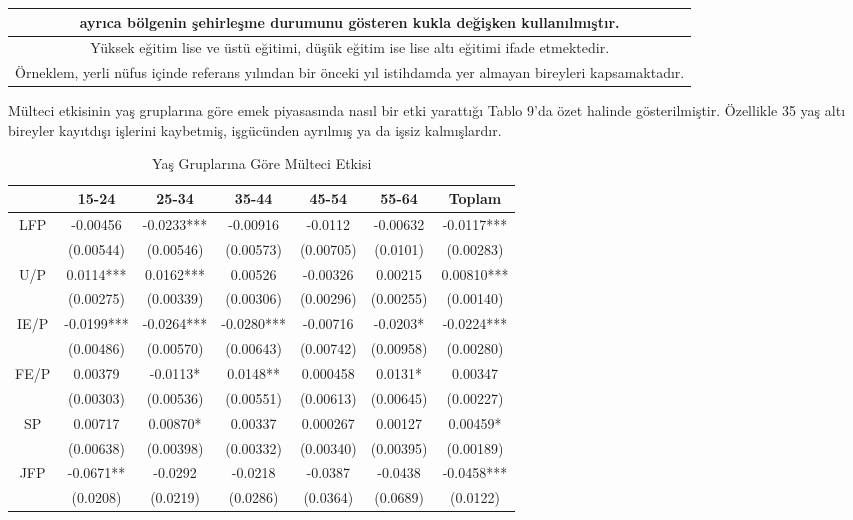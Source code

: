 \documentclass{article}
\begin{document}
\begin{justify}
\begin{table}[h]
\begin{tabular}{|ccccccc|}
                    \multicolumn{7}{|c|}{\scriptsize ayrıca bölgenin şehirleşme durumunu gösteren kukla değişken kullanılmıştır.} \\ \hline
                    \multicolumn{7}{|c|}{\scriptsize Yüksek eğitim lise ve üstü eğitimi, düşük eğitim ise lise altı eğitimi ifade etmektedir.} \\ \hline
                    \multicolumn{7}{|c|}{\scriptsize Örneklem, yerli nüfus içinde referans yılından bir önceki yıl istihdamda yer almayan bireyleri kapsamaktadır.} \\ \hline

                \end{tabular}
        \end{table}
        \FloatBarrier

        \newpage

        Mülteci etkisinin yaş gruplarına göre emek piyasasında nasıl bir etki yarattığı Tablo 9'da özet 
        halinde gösterilmiştir. Özellikle 35 yaş altı bireyler kayıtdışı işlerini kaybetmiş, işgücünden ayrılmış ya da 
        işsiz kalmışlardır. 
        \FloatBarrier
        \begin{table}[h]
            \centering
            \caption{Yaş Gruplarına Göre Mülteci Etkisi}
            \begin{tabular}{|ccccccc|}
                \hline
                    
                & 15-24 & 25-34 & 35-44 & 45-54 & 55-64 & Toplam \\ \hline
                LFP & -0.00456 & -0.0233*** & -0.00916 & -0.0112 & -0.00632 & -0.0117*** \\ 
                 & (0.00544) & (0.00546) & (0.00573) & (0.00705) & (0.0101) & (0.00283)    \\ 
                U/P & 0.0114*** & 0.0162*** & 0.00526 & -0.00326 & 0.00215 & 0.00810*** \\ 
                 & (0.00275) & (0.00339) & (0.00306) & (0.00296) & (0.00255) & (0.00140)    \\ 
                IE/P & -0.0199*** & -0.0264*** & -0.0280*** & -0.00716 & -0.0203* & -0.0224*** \\ 
                 & (0.00486) & (0.00570) & (0.00643) & (0.00742) & (0.00958) & (0.00280)    \\ 
                FE/P & 0.00379 & -0.0113* & 0.0148** & 0.000458 & 0.0131* & 0.00347 \\ 
                 & (0.00303) & (0.00536) & (0.00551) & (0.00613) & (0.00645) & (0.00227) \\ 
                SP & 0.00717 & 0.00870* & 0.00337 & 0.000267 & 0.00127 & 0.00459* \\ 
                 & (0.00638) & (0.00398) & (0.00332) & (0.00340) & (0.00395) & (0.00189) \\ 
                JFP & -0.0671** & -0.0292 & -0.0218 & -0.0387 & -0.0438 & -0.0458*** \\ 
                 & (0.0208) & (0.0219) & (0.0286) & (0.0364) & (0.0689) & (0.0122)    \\ \hline
                   

\end{tabular}
\end{table}
\end{justify}
\end{document}
